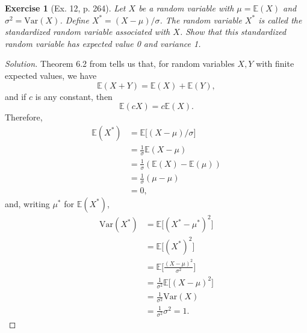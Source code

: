 \documentclass[letterpaper, 10 pt, conference]{article}
\newtheorem{ex}{Exercise}
\newcommand\E{\ensuremath{\mathbb{E}}}
\newcommand\V{\ensuremath{\mathrm{Var}}}
\begin{document}
\begin{ex}[Ex. 12, p. 264]
	Let $X$ be a random variable with $\mu = \E(X)$ and $\sigma^2 = \V(X)$. Define $X^\ast = (X-\mu)/\sigma$. The random variable $X^\ast$ is called the \textit{standardized random variable} associated with $X$. Show that this standardized random variable has expected value 0 and variance 1.
\end{ex}
\begin{proof}[Solution]
	Theorem 6.2 from \citet{snell} tells us that, for random variables $X, Y$ with finite expected values, we have 
	\begin{equation}
		\E(X+Y) = \E(X) + \E(Y),
	\end{equation}
	and if $c$ is any constant, then
	\begin{equation}
		\E(cX) = c\E(X).
	\end{equation}
	Therefore, 
	\begin{align}
		\E(X^\ast) &= \E\lbrack(X-\mu)/\sigma\rbrack\\
		&= \frac{1}{\sigma} \E(X - \mu)\\
		&= \frac{1}{\sigma} (\E(X) - \E(\mu))\\
		&= \frac{1}{\sigma} (\mu - \mu)\\
		&= 0,
	\end{align}
	and, writing $\mu^\ast$ for $\E(X^\ast)$, 
	\begin{align}
		\V(X^\ast) &= \E\lbrack(X^\ast - \mu^\ast)^2\rbrack\\
		&= \E\lbrack(X^\ast)^2\rbrack\\
		&= \E\lbrack \frac{(X-\mu)^2}{\sigma^2}\rbrack\\
		&= \frac{1}{\sigma^2} \E\lbrack(X-\mu)^2\rbrack\\
		&= \frac{1}{\sigma^2} \V(X)\\
		&= \frac{1}{\sigma^2}\sigma^2 = 1.
	\end{align}
\end{proof}
\end{document}
